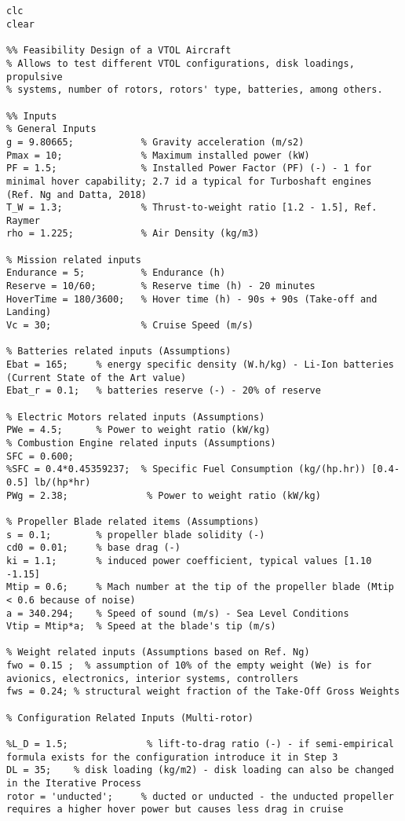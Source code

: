 \begin{verbatim}


clc
clear

%% Feasibility Design of a VTOL Aircraft
% Allows to test different VTOL configurations, disk loadings, propulsive
% systems, number of rotors, rotors' type, batteries, among others.

%% Inputs
% General Inputs
g = 9.80665;            % Gravity acceleration (m/s2)
Pmax = 10;              % Maximum installed power (kW)
PF = 1.5;               % Installed Power Factor (PF) (-) - 1 for minimal hover capability; 2.7 id a typical for Turboshaft engines (Ref. Ng and Datta, 2018)
T_W = 1.3;              % Thrust-to-weight ratio [1.2 - 1.5], Ref. Raymer
rho = 1.225;            % Air Density (kg/m3)

% Mission related inputs
Endurance = 5;          % Endurance (h)
Reserve = 10/60;        % Reserve time (h) - 20 minutes
HoverTime = 180/3600;   % Hover time (h) - 90s + 90s (Take-off and Landing)
Vc = 30;                % Cruise Speed (m/s)

% Batteries related inputs (Assumptions)
Ebat = 165;     % energy specific density (W.h/kg) - Li-Ion batteries (Current State of the Art value)
Ebat_r = 0.1;   % batteries reserve (-) - 20% of reserve

% Electric Motors related inputs (Assumptions)
PWe = 4.5;      % Power to weight ratio (kW/kg)
% Combustion Engine related inputs (Assumptions)
SFC = 0.600;
%SFC = 0.4*0.45359237;	% Specific Fuel Consumption (kg/(hp.hr)) [0.4-0.5] lb/(hp*hr)
PWg = 2.38;              % Power to weight ratio (kW/kg)

% Propeller Blade related items (Assumptions)
s = 0.1;        % propeller blade solidity (-)
cd0 = 0.01;     % base drag (-)
ki = 1.1;       % induced power coefficient, typical values [1.10 -1.15]
Mtip = 0.6;     % Mach number at the tip of the propeller blade (Mtip < 0.6 because of noise)
a = 340.294;    % Speed of sound (m/s) - Sea Level Conditions
Vtip = Mtip*a;  % Speed at the blade's tip (m/s)

% Weight related inputs (Assumptions based on Ref. Ng)
fwo = 0.15 ;  % assumption of 10% of the empty weight (We) is for avionics, electronics, interior systems, controllers
fws = 0.24; % structural weight fraction of the Take-Off Gross Weights

% Configuration Related Inputs (Multi-rotor)

%L_D = 1.5;              % lift-to-drag ratio (-) - if semi-empirical formula exists for the configuration introduce it in Step 3
DL = 35;	% disk loading (kg/m2) - disk loading can also be changed in the Iterative Process
rotor = 'unducted';     % ducted or unducted - the unducted propeller requires a higher hover power but causes less drag in cruise


\end{verbatim}
